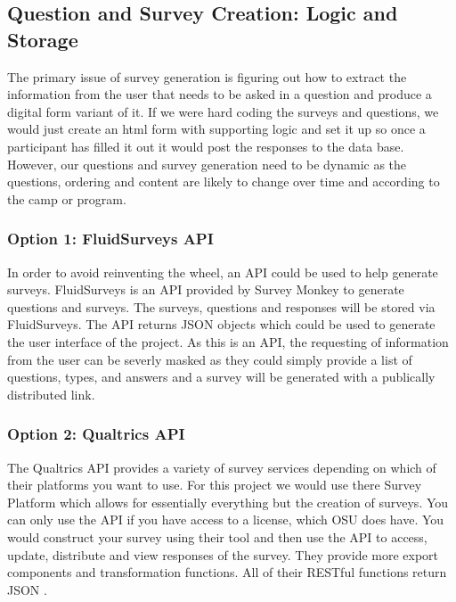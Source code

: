 \documentclass[letterpaper,10pt,serif, draftclsnofoot,onecolumn, compsoc, titlepage]{IEEEtran}
\begin{document}
\subsection{Question and Survey Creation: Logic and Storage}
The primary issue of survey generation is figuring out how to extract the information from the user that needs to be asked
in a question and produce a digital form variant of it. If we were hard coding the surveys and questions, we would just create
an html form with supporting logic and set it up so once a participant has filled it out it would post the responses to the data base. 
However, our questions and survey generation need to be dynamic as the questions, ordering and content are likely to change over
time and according to the camp or program. 
\subsubsection{Option 1: FluidSurveys API}
In order to avoid reinventing the wheel, an API could be used to help generate surveys. FluidSurveys is an API provided by Survey Monkey to generate questions and surveys. The surveys, questions and responses will be stored via FluidSurveys. The API returns JSON objects which could be used to generate the user interface of the project\cite{fluidSurveys}. As this is an API, the requesting of information 
from the user can be severly masked as they could simply provide a list of questions, types, and answers and a survey will be 
generated with a publically distributed link. 
\subsubsection{Option 2: Qualtrics API}
The Qualtrics API provides a variety of survey services depending on which of their platforms you want to use. For this project
we would use there Survey Platform which allows for essentially everything but the creation of surveys\cite{qualtricsAPI}. You can only use the 
API if you have access to a license, which OSU does have\cite{oregonStateQual}. You would construct your survey using their tool and then 
use the API to access, update, distribute and view responses of the survey. They provide more export components and 
transformation functions. All of their RESTful functions return JSON \cite{qualtricsAPI}. 
\end{document}
